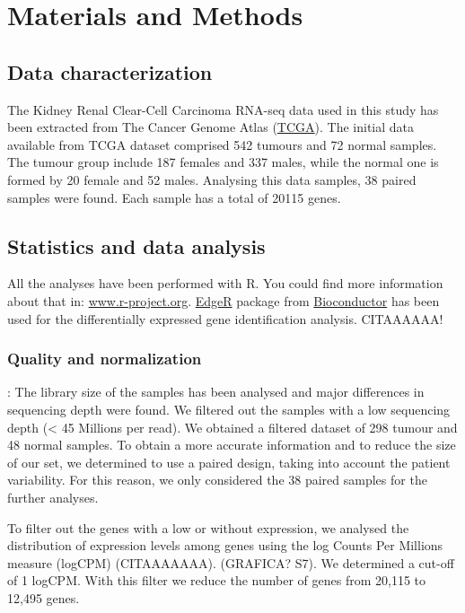 \documentclass[9pt,twocolumn,twoside]{gsajnl}
\begin{document}
\section*{Materials and Methods}
\subsection*{Data characterization}
The Kidney Renal Clear-Cell Carcinoma RNA-seq data used in this study has been extracted from The Cancer Genome Atlas (\href{http://www.cancergenome.nih.gov}{TCGA}). The initial data available from TCGA dataset comprised 542 tumours and 72 normal samples. The tumour group include 187 females and 337 males, while the normal one is formed by 20 female and 52 males. Analysing this data samples, 38 paired samples were found. Each sample has a total of 20115 genes. 

\subsection*{Statistics and data analysis}
All the analyses have been performed with R. You could find more information about that in: \url{www.r-project.org}. \href{https://bioconductor.org/packages/release/bioc/html/edgeR.html}{EdgeR} \citep{Robinson2010} package from \href{https://bioconductor.org}{Bioconductor} \citep{Gentleman2004} has been used for the differentially expressed gene identification analysis.  CITAAAAAA!

\subsubsection*{Quality and normalization }
: The library size of the samples has been analysed and major differences in sequencing depth were found. We filtered out the samples with a low sequencing depth (< 45 Millions per read). We obtained a filtered dataset of 298 tumour and 48 normal samples. To obtain a more accurate information and to reduce the size of our set, we determined to use a paired design, taking into account the patient variability. For this reason, we only considered the 38 paired samples for the further analyses.

To filter out the genes with a low or without expression, we analysed the distribution of expression levels among genes using the log Counts Per Millions measure (logCPM) (CITAAAAAAA). (GRAFICA? S7). We determined a cut-off of 1 logCPM. With this filter we reduce the number of genes from 20,115 to 12,495 genes.
\end{document}
